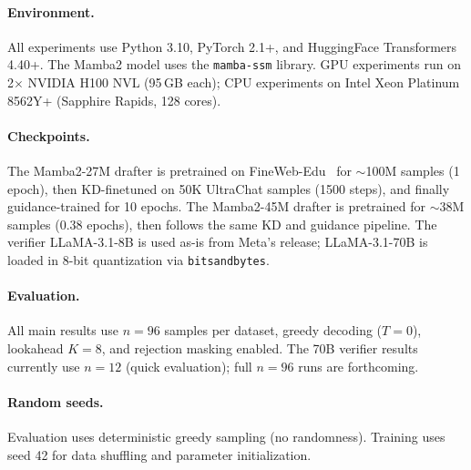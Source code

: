 \paragraph{Environment.}
All experiments use Python 3.10, PyTorch 2.1+, and HuggingFace Transformers 4.40+.
The Mamba2 model uses the \texttt{mamba-ssm} library.
GPU experiments run on 2$\times$ NVIDIA H100 NVL (95\,GB each); CPU experiments on Intel Xeon Platinum 8562Y+ (Sapphire Rapids, 128 cores).

\paragraph{Checkpoints.}
The Mamba2-27M drafter is pretrained on FineWeb-Edu~\citep{penedo2024finewebedu} for $\sim$100M samples (1 epoch), then KD-finetuned on 50K UltraChat samples (1500 steps), and finally guidance-trained for 10 epochs.
The Mamba2-45M drafter is pretrained for $\sim$38M samples (0.38 epochs), then follows the same KD and guidance pipeline.
The verifier LLaMA-3.1-8B is used as-is from Meta's release; LLaMA-3.1-70B is loaded in 8-bit quantization via \texttt{bitsandbytes}.

\paragraph{Evaluation.}
All main results use $n\!=\!96$ samples per dataset, greedy decoding ($T\!=\!0$), lookahead $K\!=\!8$, and rejection masking enabled.
The 70B verifier results currently use $n\!=\!12$ (quick evaluation); full $n\!=\!96$ runs are forthcoming.

\paragraph{Random seeds.}
Evaluation uses deterministic greedy sampling (no randomness).
Training uses seed 42 for data shuffling and parameter initialization.
